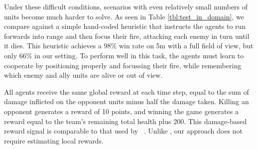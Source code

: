 \documentclass[letterpaper]{article}
\newcommand{\citet}[1]{\citeauthor{#1}~\shortcite{#1}}
\begin{document}
Under these difficult conditions, scenarios with even relatively small numbers
of units become much harder to solve. As seen in Table \ref{tbl:test_in_domain},
we compare against a simple hand-coded heuristic that instructs the agents to
run forwards into range and then focus their fire, attacking each enemy in turn
until it dies. This heuristic achieves a 98\% win rate on 5m with a full field
of view, but only 66\% in our setting. To perform well in this task, the agents
must learn to cooperate by positioning properly and focussing their fire,
while remembering which enemy and ally units are alive or out of
view.

All agents receive the same global reward at each time step, equal to the sum of
damage inflicted on the opponent units minus half the damage taken. Killing an
opponent generates a reward of 10 points, and winning the game generates a
reward equal to the team's remaining total health plus 200. This damage-based
reward signal is comparable to that used by \citet{usunier2016episodic}. Unlike 
\cite{peng2017multiagent}, our approach does not require estimating local 
rewards.
\end{document}
